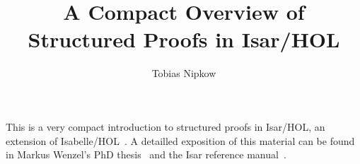 \documentclass[11pt,a4paper]{article}
\begin{document}
\title{A Compact Overview of Structured Proofs in Isar/HOL}
\author{Tobias Nipkow}
\date{}
\maketitle

\noindent
This is a very compact introduction to structured proofs in
Isar/HOL, an extension of Isabelle/HOL~\cite{LNCS2283}. A detailled
exposition of this material can be found in Markus Wenzel's PhD
thesis~\cite{Wenzel-PhD} and the Isar reference manual~\cite{Isar-Ref-Man}.



%



\begingroup
 \small\raggedright\frenchspacing

\endgroup
\end{document}
